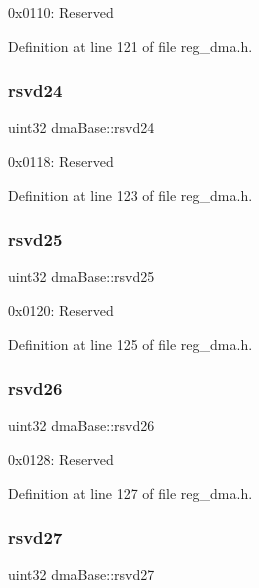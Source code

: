 0x0110\+: Reserved 

Definition at line 121 of file reg\+\_\+dma.\+h.

\mbox{\label{structdmaBase_ae4d738a44723feb837a0f8823e6ab98d}} 
\subsubsection{\texorpdfstring{rsvd24}{rsvd24}}
{\footnotesize\ttfamily uint32 dma\+Base\+::rsvd24}

0x0118\+: Reserved 

Definition at line 123 of file reg\+\_\+dma.\+h.

\mbox{\label{structdmaBase_a5bd3d236c94b8e9155155a7d0f9f17e9}} 
\subsubsection{\texorpdfstring{rsvd25}{rsvd25}}
{\footnotesize\ttfamily uint32 dma\+Base\+::rsvd25}

0x0120\+: Reserved 

Definition at line 125 of file reg\+\_\+dma.\+h.

\mbox{\label{structdmaBase_a72e9bac240af4837aae655752f3e5f01}} 
\subsubsection{\texorpdfstring{rsvd26}{rsvd26}}
{\footnotesize\ttfamily uint32 dma\+Base\+::rsvd26}

0x0128\+: Reserved 

Definition at line 127 of file reg\+\_\+dma.\+h.

\mbox{\label{structdmaBase_a851125fc6afea033e49ae94a18edf4d6}} 
\subsubsection{\texorpdfstring{rsvd27}{rsvd27}}
{\footnotesize\ttfamily uint32 dma\+Base\+::rsvd27}

